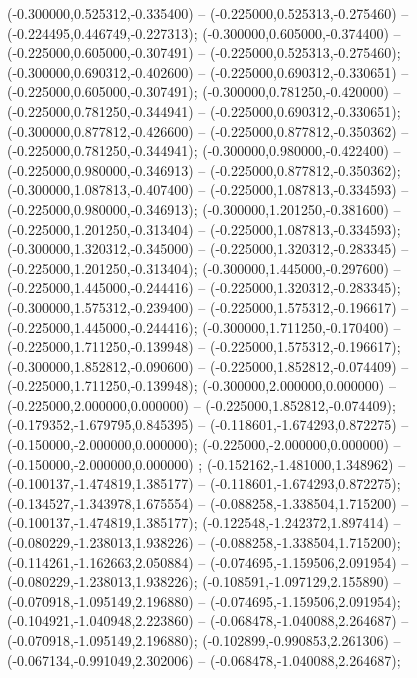  (-0.300000,0.525312,-0.335400) -- (-0.225000,0.525313,-0.275460) -- (-0.224495,0.446749,-0.227313);
 (-0.300000,0.605000,-0.374400) -- (-0.225000,0.605000,-0.307491) -- (-0.225000,0.525313,-0.275460);
 (-0.300000,0.690312,-0.402600) -- (-0.225000,0.690312,-0.330651) -- (-0.225000,0.605000,-0.307491);
 (-0.300000,0.781250,-0.420000) -- (-0.225000,0.781250,-0.344941) -- (-0.225000,0.690312,-0.330651);
 (-0.300000,0.877812,-0.426600) -- (-0.225000,0.877812,-0.350362) -- (-0.225000,0.781250,-0.344941);
 (-0.300000,0.980000,-0.422400) -- (-0.225000,0.980000,-0.346913) -- (-0.225000,0.877812,-0.350362);
 (-0.300000,1.087813,-0.407400) -- (-0.225000,1.087813,-0.334593) -- (-0.225000,0.980000,-0.346913);
 (-0.300000,1.201250,-0.381600) -- (-0.225000,1.201250,-0.313404) -- (-0.225000,1.087813,-0.334593);
 (-0.300000,1.320312,-0.345000) -- (-0.225000,1.320312,-0.283345) -- (-0.225000,1.201250,-0.313404);
 (-0.300000,1.445000,-0.297600) -- (-0.225000,1.445000,-0.244416) -- (-0.225000,1.320312,-0.283345);
 (-0.300000,1.575312,-0.239400) -- (-0.225000,1.575312,-0.196617) -- (-0.225000,1.445000,-0.244416);
 (-0.300000,1.711250,-0.170400) -- (-0.225000,1.711250,-0.139948) -- (-0.225000,1.575312,-0.196617);
 (-0.300000,1.852812,-0.090600) -- (-0.225000,1.852812,-0.074409) -- (-0.225000,1.711250,-0.139948);
 (-0.300000,2.000000,0.000000) -- (-0.225000,2.000000,0.000000) -- (-0.225000,1.852812,-0.074409);
 (-0.179352,-1.679795,0.845395) -- (-0.118601,-1.674293,0.872275) -- (-0.150000,-2.000000,0.000000);
 (-0.225000,-2.000000,0.000000) -- (-0.150000,-2.000000,0.000000) ;
 (-0.152162,-1.481000,1.348962) -- (-0.100137,-1.474819,1.385177) -- (-0.118601,-1.674293,0.872275);
 (-0.134527,-1.343978,1.675554) -- (-0.088258,-1.338504,1.715200) -- (-0.100137,-1.474819,1.385177);
 (-0.122548,-1.242372,1.897414) -- (-0.080229,-1.238013,1.938226) -- (-0.088258,-1.338504,1.715200);
 (-0.114261,-1.162663,2.050884) -- (-0.074695,-1.159506,2.091954) -- (-0.080229,-1.238013,1.938226);
 (-0.108591,-1.097129,2.155890) -- (-0.070918,-1.095149,2.196880) -- (-0.074695,-1.159506,2.091954);
 (-0.104921,-1.040948,2.223860) -- (-0.068478,-1.040088,2.264687) -- (-0.070918,-1.095149,2.196880);
 (-0.102899,-0.990853,2.261306) -- (-0.067134,-0.991049,2.302006) -- (-0.068478,-1.040088,2.264687);
